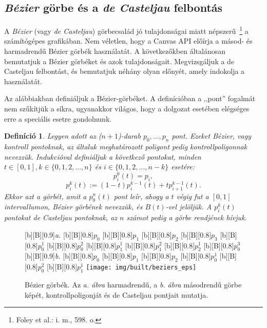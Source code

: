 \documentclass[12pt]{report}
\newtheorem{defi}[tét]{Definíció}
\theoremstyle{definition}
\begin{document}
    \subsection*{\emph{Bézier} görbe és a \emph{de Casteljau} felbontás}
    \label{Bézier görbe és a de Casteljau felbontás}

A \emph{Bézier} (vagy \emph{de Casteljau}) görbecsalád jó tulajdonságai miatt
népszerű~\footnote{Foley et al.: i. m., 598. o.} a számítógépes grafikában. Nem
véletlen, hogy a Canvas API előírja a másod- és harmadrendű Bézier görbék
használatát. A következőkben általánosan bemutatjuk a Bézier görbéket és azok
tulajdonságait. Megvizsgáljuk a de Casteljau felbontást, és bemutatjuk néhány
olyan előnyét, amely indokolja a használatát.

Az alábbiakban definiáljuk a Bézier-görbéket. A definícióban a ,,pont'' fogalmát
nem szűkítjük a síkra, ugyanakkor világos, hogy a dolgozat esetében elégséges
erre a speciális esetre gondolnunk.

\begin{defi}\label{Bézier}\cite[Kurusa]{Kurusa:1999:szamitogepes} Legyen adott
az ($n+1$)-darab $p_0,...,p_n$ pont. Ezeket Bézier, vagy kontroll pontoknak, az
általuk meghatározott poligont pedig kontrollpoligonnak nevezzük.  Indukcióval
definiáljuk a következő pontokat, minden $t \in [0,1], k \in \{{0,1,2,...,n\}}$
és $i \in \{{0,1,2,...,n-k\}}$ esetére: \[p^0_i(t)=p_i,\]
\[p^k_i(t):=(1-t)p^{k-1}_i(t) + tp^{k-1}_{i+1}(t).\] Ekkor azt a görbét, amit a
$p^n_0(t)$ pont leír, ahogy a $t$ végig fut a $[0,1]$ intervallumon, Bézier
görbének nevezzük, és $B(t)$-vel jelöljük. A $p^k_i(t)$ pontokat de Casteljau
pontoknak, az $n$ számot pedig a görbe rendjének hívjuk.  \end{defi}

  \begin{figure}
  [b][B][0.9]{\emph{a.}}
  [b][B][0.8]{\bf{$p_{0}$}}
  [b][B][0.8]{\bf{$p_{1}$}}
  [b][B][0.8]{\bf{$p_{2}$}}
  [b][B][0.8]{\bf{$p_{3}$}}
  [b][B][0.8]{\bf{$p_{0}^{1}$}}
  [b][B][0.8]{\bf{$p_{0}^{2}$}}
  [b][B][0.8]{\bf{$p_{1}^{1}$}}
  [b][B][0.8]{\bf{$p_{1}^{2}$}}
  [b][B][0.8]{\bf{$p_{2}^{1}$}}
  [b][B][0.8]{\bf{$p_{0}^{3}$}}
  [b][B][0.9]{\emph{b.}}
  [b][B][0.8]{\bf{$p_{0}$}}
  [b][B][0.8]{\bf{$p_{1}$}}
  [b][B][0.8]{\bf{$p_{2}$}}
  [b][B][0.8]{\bf{$p_{0}^{1}$}}
  [b][B][0.8]{\bf{$p_{0}^{2}$}}
  [b][B][0.8]{\bf{$p_{1}^{1}$}}
    \centering
    \texttt{[image: img/built/beziers\_eps]}
    \caption{\label{beziers} Bézier görbék. Az \emph{a. ábra} harmadrendű, a
    \emph{b. ábra} másodrendű görbe képét, kontrollpoligonját és de
    Casteljau pontjait mutatja.}
  \end{figure}
\end{document}
